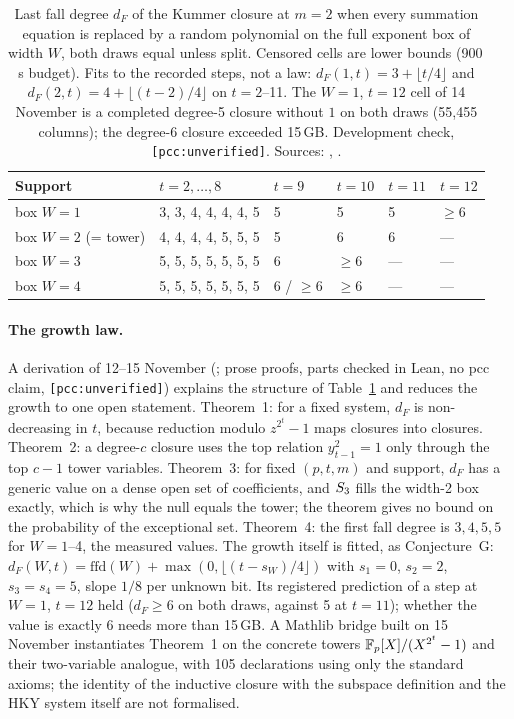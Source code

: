 \begin{table}[t]
\centering\small
\begin{tabular}{@{}llllll@{}}
\toprule
Support & $t=2,\dots,8$ & $t=9$ & $t=10$ & $t=11$ & $t=12$ \\
\midrule
box $W=1$ & 3, 3, 4, 4, 4, 4, 5 & 5 & 5 & 5 & $\ge6$ \\
box $W=2$ (= tower) & 4, 4, 4, 4, 5, 5, 5 & 5 & 6 & 6 & --- \\
box $W=3$ & 5, 5, 5, 5, 5, 5, 5 & 6 & $\ge6$ & --- & --- \\
box $W=4$ & 5, 5, 5, 5, 5, 5, 5 & 6 / $\ge6$ & $\ge6$ & --- & --- \\
\bottomrule
\end{tabular}
\caption[]{Last fall degree $d_F$ of the Kummer closure at $m=2$ when every
summation equation is replaced by a random polynomial on the full exponent
box of width $W$, both draws equal unless split. Censored cells are lower
bounds (900\,s budget). Fits to the recorded steps, not a law:
$d_F(1,t)=3+\lfloor t/4\rfloor$ and $d_F(2,t)=4+\lfloor(t-2)/4\rfloor$ on
$t=2$--11. The $W=1$, $t=12$ cell of 14 November is a completed degree-5
closure without $1$ on both draws (55{,}455 columns); the degree-6 closure
exceeded 15\,GB. Development check, \texttt{[pcc:unverified]}. Sources:
,
.}
\label{tab:pa-width}
\end{table}

\paragraph{The growth law.} A derivation of 12--15 November
(; prose proofs,
parts checked in Lean, no pcc claim, \texttt{[pcc:unverified]}) explains the
structure of Table~\ref{tab:pa-width} and reduces the growth to one open
statement. Theorem~1: for a fixed system, $d_F$ is non-decreasing in $t$,
because reduction modulo $z^{2^t}-1$ maps closures into closures. Theorem~2:
a degree-$c$ closure uses the top relation $y_{t-1}^2=1$ only through the
top $c-1$ tower variables. Theorem~3: for fixed $(p,t,m)$ and support, $d_F$
has a generic value on a dense open set of coefficients, and $S_{3}$ fills
the width-2 box exactly, which is why the null equals the tower; the theorem
gives no bound on the probability of the exceptional set. Theorem~4: the
first fall degree is $3,4,5,5$ for $W=1$--4, the measured values. The growth
itself is fitted, as Conjecture~G:
$d_F(W,t)=\mathrm{ffd}(W)+\max(0,\lfloor(t-s_W)/4\rfloor)$ with
$s_1=0$, $s_2=2$, $s_3=s_4=5$, slope $1/8$ per unknown bit. Its registered
prediction of a step at $W=1$, $t=12$ held ($d_F\ge6$ on both draws, against
5 at $t=11$); whether the value is exactly 6 needs more than 15\,GB. A
Mathlib bridge built on 15 November instantiates Theorem~1 on the concrete
towers $\mathbb{F}_p[X]/(X^{2^t}-1)$ and their two-variable analogue, with 105
declarations using only the standard axioms; the identity of the inductive
closure with the subspace definition and the HKY system itself are not
formalised.

